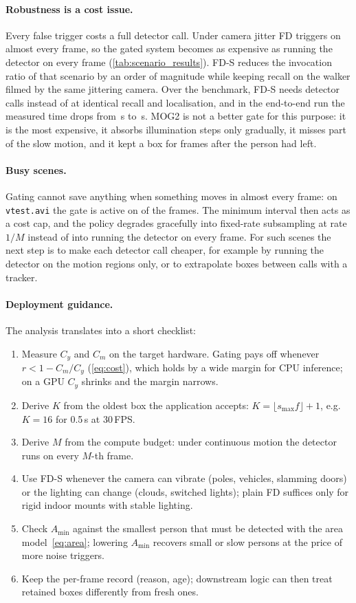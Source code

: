 \documentclass[12pt,a4paper]{article}
\theoremstyle{plain}
\theoremstyle{definition}
\newcommand{\code}[1]{\texttt{#1}}
\newcommand{\FD}{FD}
\newcommand{\FDS}{FD-S}
\begin{document}
\paragraph{Robustness is a cost issue.} Every false trigger costs a full detector call. Under camera jitter \FD{} triggers on almost every frame, so the gated system becomes as expensive as running the detector on every frame (\cref{tab:scenario_results}). \FDS{} reduces the invocation ratio of that scenario by an order of magnitude while keeping recall on the walker filmed by the same jittering camera. Over the benchmark, \FDS{} needs \PolCallsFDS{} detector calls instead of \PolCallsFD{} at identical recall and localisation, and in the end-to-end run the measured time drops from \EtoeMeasuredFD\,s to \EtoeMeasuredFDS\,s. MOG2 is not a better gate for this purpose: it is the most expensive, it absorbs illumination steps only gradually, it misses part of the slow motion, and it kept a box for \PolExitMOG{} frames after the person had left.

\paragraph{Busy scenes.} Gating cannot save anything when something moves in almost every frame: on \code{vtest.avi} the gate is active on \VtActiveFDS{} of the frames. The minimum interval then acts as a cost cap, and the policy degrades gracefully into fixed-rate subsampling at rate $1/M$ instead of into running the detector on every frame. For such scenes the next step is to make each detector call cheaper, for example by running the detector on the motion regions only, or to extrapolate boxes between calls with a tracker.

\paragraph{Deployment guidance.} The analysis translates into a short checklist:
\begin{enumerate}
\item Measure $C_y$ and $C_m$ on the target hardware. Gating pays off whenever $r<1-C_m/C_y$ (\cref{eq:cost}), which holds by a wide margin for CPU inference; on a GPU $C_y$ shrinks and the margin narrows.
\item Derive $K$ from the oldest box the application accepts: $K=\lfloor s_{\max}f\rfloor+1$, e.g.\ $K=16$ for 0.5\,s at 30\,FPS.
\item Derive $M$ from the compute budget: under continuous motion the detector runs on every $M$-th frame.
\item Use \FDS{} whenever the camera can vibrate (poles, vehicles, slamming doors) or the lighting can change (clouds, switched lights); plain \FD{} suffices only for rigid indoor mounts with stable lighting.
\item Check $A_{\min}$ against the smallest person that must be detected with the area model~\eqref{eq:area}; lowering $A_{\min}$ recovers small or slow persons at the price of more noise triggers.
\item Keep the per-frame record (reason, age); downstream logic can then treat retained boxes differently from fresh ones.
\end{enumerate}
\end{document}
